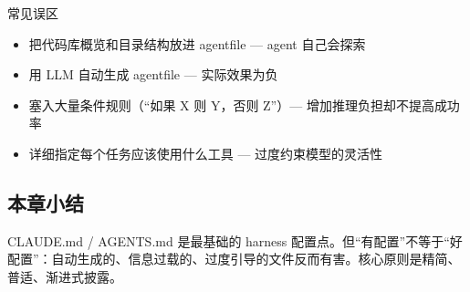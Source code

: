 \begin{warningbox}{常见误区}
\begin{itemize}[leftmargin=1.5em]
    \item 把代码库概览和目录结构放进 agentfile --- agent 自己会探索
    \item 用 LLM 自动生成 agentfile --- 实际效果为负
    \item 塞入大量条件规则（``如果 X 则 Y，否则 Z''）--- 增加推理负担却不提高成功率
    \item 详细指定每个任务应该使用什么工具 --- 过度约束模型的灵活性
\end{itemize}
\end{warningbox}

\subsection{本章小结}

CLAUDE.md / AGENTS.md 是最基础的 harness 配置点。但``有配置''不等于``好配置''：自动生成的、信息过载的、过度引导的文件反而有害。核心原则是精简、普适、渐进式披露。


